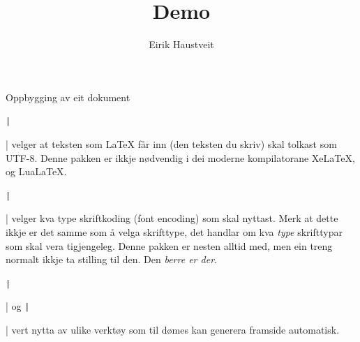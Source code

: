 
	\begin{frame}[containsverbatim]{Oppbygging av eit dokument}
	

		\texttt|\usepackage[utf8]{inputenc}| velger at teksten som \LaTeX{} får inn (den teksten du skriv) skal tolkast som UTF-8. Denne pakken er ikkje nødvendig i dei moderne kompilatorane XeLaTeX, og LuaLaTeX.
		
		\texttt|\usepackage[T1]{fontenc}| velger kva type skriftkoding (font encoding) som skal nyttast. Merk at dette ikkje er det samme som å velga skrifttype, det handlar om kva \textit{type} skrifttypar som skal vera tigjengeleg. Denne pakken er nesten alltid med, men ein treng normalt ikkje ta stilling til den. Den \textit{berre er der}.
		
		\texttt|\author{Eirik Haustveit}| og \texttt|\title{Demo}| vert nytta av ulike verktøy som til dømes kan generera framside automatisk.
		
	\end{frame}
	
